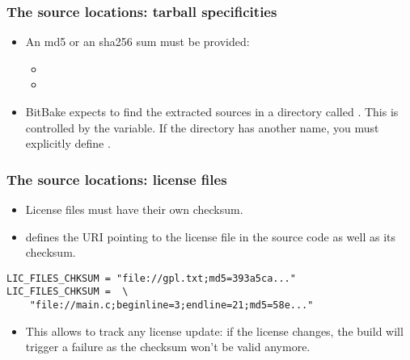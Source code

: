 \begin{frame}
  \frametitle{The source locations: tarball specificities}
  \begin{itemize}
    \item An md5 or an sha256 sum must be provided:
      \begin{itemize}
        \item {}
        \item {}
      \end{itemize}
    \item BitBake expects to find the extracted sources in a
      directory called . This is
      controlled by the  variable. If the directory has
      another name, you must explicitly define .
  \end{itemize}
\end{frame}

\begin{frame}[fragile]
  \frametitle{The source locations: license files}
  \begin{itemize}
    \item License files must have their own checksum.
    \item {} defines the URI pointing to the
      license file in the source code as well as its checksum.
  \end{itemize}
  \begin{block}{}
    \begin{verbatim}
LIC_FILES_CHKSUM = "file://gpl.txt;md5=393a5ca..."
LIC_FILES_CHKSUM =  \
    "file://main.c;beginline=3;endline=21;md5=58e..."
    \end{verbatim}
  \end{block}
  \begin{itemize}
    \item This allows to track any license update: if the license
      changes, the build will trigger a failure as the checksum won't
      be valid anymore.
  \end{itemize}
\end{frame}

